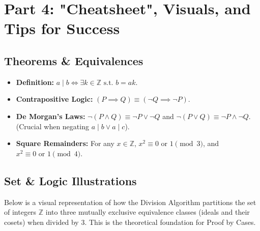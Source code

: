 \documentclass[11pt]{article}
\theoremstyle{definition}
\theoremstyle{remark}
\newcommand{\Z}{\mathbb{Z}}
\begin{document}
\newpage
\section{Part 4: "Cheatsheet", Visuals, and Tips for Success}

\subsection{Theorems \& Equivalences}
\begin{itemize}
    \item \textbf{Definition:} $a \mid b \iff \exists k \in \Z \text{ s.t. } b = ak$.
    \item \textbf{Contrapositive Logic:} $(P \implies Q) \equiv (\neg Q \implies \neg P)$.
    \item \textbf{De Morgan's Laws:} $\neg(P \land Q) \equiv \neg P \lor \neg Q$ and $\neg(P \lor Q) \equiv \neg P \land \neg Q$. (Crucial when negating $a \mid b \lor a \mid c$).
    \item \textbf{Square Remainders:} For any $x \in \Z$, $x^2 \equiv 0 \text{ or } 1 \pmod 3$, and $x^2 \equiv 0 \text{ or } 1 \pmod 4$.
\end{itemize}

\subsection{Set \& Logic Illustrations}
Below is a visual representation of how the Division Algorithm partitions the set of integers $\Z$ into three mutually exclusive equivalence classes (ideals and their cosets) when divided by $3$. This is the theoretical foundation for Proof by Cases.
\end{document}
